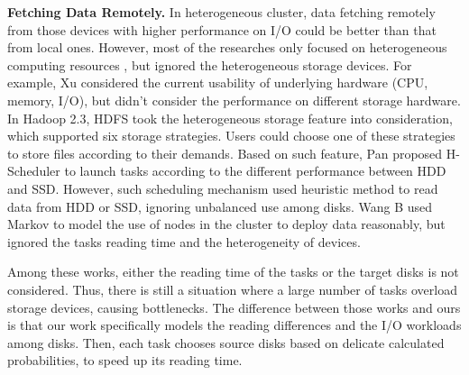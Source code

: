 \documentclass[conference]{IEEEtran}
\begin{document}
\textbf{Fetching Data Remotely.} 
In heterogeneous cluster, data fetching remotely from those devices with higher performance on I/O could be better than that from local ones.
However, most of the researches only focused on heterogeneous computing resources \cite{b25} \cite{b26} \cite{b35} \cite{b36} \cite{b6}, but ignored the heterogeneous storage devices. For example, Xu \cite{b6} considered the current usability of underlying hardware (CPU, memory, I/O), but didn't consider the performance on different storage hardware. 
In Hadoop 2.3, HDFS\cite{b19} took the heterogeneous storage feature into consideration, which supported six storage strategies. Users could choose one of these strategies to store files according to their demands.
Based on such feature, Pan \cite{b7} proposed H-Scheduler to launch tasks according to the different performance between HDD and SSD. However, such scheduling mechanism used heuristic method to read data from HDD or SSD, ignoring unbalanced use among disks.
Wang B \cite{b8} used Markov to model the use of nodes in the cluster to deploy data reasonably, but ignored the tasks reading time and the heterogeneity of devices. %

Among these works, either the reading time of the tasks or the target disks is not considered. Thus, there is still a situation where a large number of tasks overload storage devices, causing bottlenecks.
The difference between those works and ours is that our work specifically models the reading differences and the I/O workloads among disks. Then, each task chooses source disks based on delicate calculated probabilities, to speed up its reading time.
\end{document}

